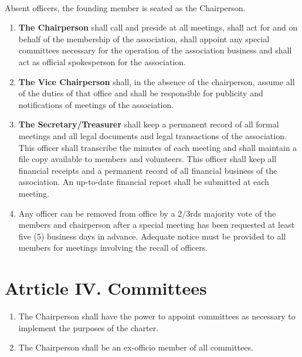 \documentclass[letterpaper,10pt]{article}
\begin{document}
\paragraph{} Absent officers, the founding member is seated as the Chairperson.

\begin{enumerate}[label=(\Alph*)]

\item \textbf{The Chairperson} shall call and preside at all meetings, shall act for and on behalf of the membership of the association, shall appoint any special committees necessary for the operation of the association business and shall act as official spokesperson for the association.

\item \textbf{The Vice Chairperson} shall, in the absence of the chairperson,
assume all of the duties of that office and shall be responsible for publicity and notifications of meetings of the association.

\item \textbf{The Secretary/Treasurer} shall keep a permanent record of all formal meetings and all legal documents and legal transactions of the association. This officer shall transcribe the minutes of each meeting and shall maintain a file copy available to members and volunteers. This officer shall keep all financial receipts and a permanent record of all financial business of the association. An up-to-date financial report shall be submitted at each meeting. 

\item Any officer can be removed from office by a 2/3rds majority vote of the members and chairperson after a special meeting has been requested at least five (5) business days in advance. Adequate notice must be provided to all members for meetings involving the recall of officers.

\end{enumerate}
\section*{Atrticle IV. Committees}
\begin{enumerate}[label=(\Alph*)]
\item The Chairperson shall have the power to appoint committees as necessary to implement the purposes of the charter.
\item The Chairperson shall be an ex-officio member of all committees.
\end{enumerate}
\end{document}
